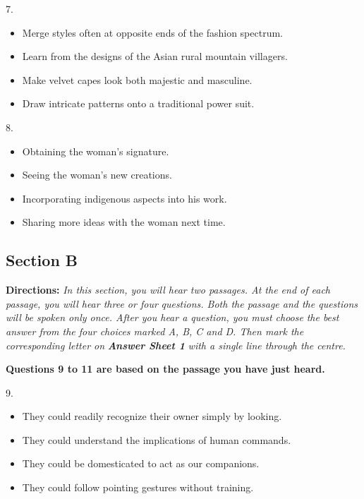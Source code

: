 \documentclass[UTF8,11pt]{ctexart}
\begin{document}
7.


\begin{itemize}[leftmargin=2em,itemsep=.2em,topsep=.4em]\item[A.] Merge styles often at opposite ends of the fashion spectrum.
\item[B.] Learn from the designs of the Asian rural mountain villagers.
\item[C.] Make velvet capes look both majestic and masculine.
\item[D.] Draw intricate patterns onto a traditional power suit.
\end{itemize}

8.


\begin{itemize}[leftmargin=2em,itemsep=.2em,topsep=.4em]\item[A.] Obtaining the woman’s signature.
\item[B.] Seeing the woman’s new creations.
\item[C.] Incorporating indigenous aspects into his work.
\item[D.] Sharing more ideas with the woman next time.
\end{itemize}

\subsection*{\textbf{Section B}}


\textbf{Directions:} \textit{In this section, you will hear two passages. At the end of each passage, you will hear three or four} \textit{questions. Both the passage and the questions will be spoken only once. After you hear a question, you must choose} \textit{the best answer from the four choices marked A, B, C and D. Then mark the corresponding letter on }\textbf{\textit{Answer Sheet 1}} \textit{with a single line through the centre.}


\textbf{Questions 9 to 11 are based on the passage you have just heard.}


9.


\begin{itemize}[leftmargin=2em,itemsep=.2em,topsep=.4em]\item[A.] They could readily recognize their owner simply by looking.
\item[B.] They could understand the implications of human commands.
\item[C.] They could be domesticated to act as our companions.
\item[D.] They could follow pointing gestures without training.
\end{itemize}
\end{document}
